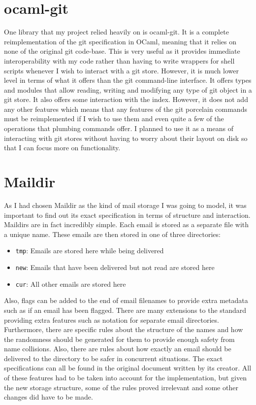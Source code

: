 \section{ocaml-git}

One library that my project relied heavily on is ocaml-git\cite{code_ocaml-git}. It is a complete reimplementation of the git specification in OCaml, meaning that it relies on none of the original git code-base. This is very useful as it provides immediate interoperability with my code rather than having to write wrappers for shell scripts whenever I wish to interact with a git store. However, it is much lower level in terms of what it offers than the git command-line interface. It offers types and modules that allow reading, writing and modifying any type of git object in a git store. It also offers some interaction with the index. However, it does not add any other features which means that any features of the git porcelain commands must be reimplemented if I wish to use them and even quite a few of the operations that plumbing commands offer. I planned to use it as a means of interacting with git stores without having to worry about their layout on disk so that I can focus more on functionality.

\section{Maildir}

As I had chosen Maildir as the kind of mail storage I was going to model, it was important to find out its exact specification in terms of structure and interaction. Maildirs are in fact incredibly simple. Each email is stored as a separate file with a unique name. These emails are then stored in one of three directories:

\begin{itemize}
\item \texttt{tmp}: Emails are stored here while being delivered
\item \texttt{new}: Emails that have been delivered but not read are stored here
\item \texttt{cur}: All other emails are stored here
\end{itemize}

Also, flags can be added to the end of email filenames to provide extra metadata such as if an email has been flagged. There are many extensions to the standard providing extra features such as notation for separate email directories. Furthermore, there are specific rules about the structure of the names and how the randomness should be generated for them to provide enough safety from name collisions. Also, there are rules about how exactly an email should be delivered to the directory to be safer in concurrent situations. The exact specifications can all be found in the original document written by its creator\cite{bernstein2000maildir}. All of these features had to be taken into account for the implementation, but given the new storage structure, some of the rules proved irrelevant and some other changes did have to be made.
